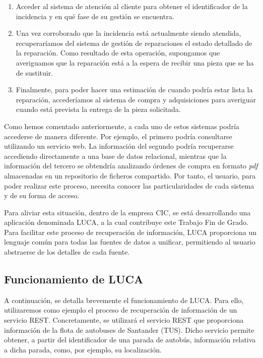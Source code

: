 \begin{enumerate}
	\item Acceder al sistema de atención al cliente para obtener el identificador de la incidencia y en qué fase de su gestión se encuentra.
	\item Una vez corroborado que la incidencia está actualmente siendo atendida, recuperaríamos del sistema de gestión de reparaciones el estado detallado de la reparación. Como resultado de esta operación, supongamos que averiguamos que la reparación está a la espera de recibir una pieza que se ha de sustituir.
	\item Finalmente, para poder hacer una estimación de cuando podría estar lista la reparación, accederíamos al sistema de compra y adquisiciones para averiguar cuando está prevista la entrega de la pieza solicitada.
\end{enumerate}

Como hemos comentado anteriormente, a cada uno de estos sistemas podría accederse de manera diferente. Por ejemplo, el primero podría consultarse utilizando un servicio web. La información del segundo podría recuperarse accediendo directamente a una base de datos relacional, mientras que la información del tercero se obtendría analizando órdenes de compra en formato \emph{pdf} almacenadas en un repositorio de ficheros compartido. Por tanto, el usuario, para poder realizar este proceso, necesita conocer las particularidades de cada sistema y de su forma de acceso.

Para aliviar esta situación, dentro de la empresa CIC, se está desarrollando una aplicación denominada LUCA, a la cual contribuye este Trabajo Fin de Grado. Para facilitar este proceso de recuperación de información, LUCA proporciona un lenguaje común para todas las fuentes de datos a unificar, permitiendo al usuario abstraerse de los detalles de cada fuente.

\subsection{Funcionamiento de LUCA}

A continuación, se detalla brevemente el funcionamiento de LUCA. Para ello, utilizaremos como ejemplo el proceso de recuperación de información de un servicio REST. Concretamente, se utilizará el servicio REST que proporciona información de la flota de autobuses de Santander (TUS). Dicho servicio permite obtener, a partir del identificador de una parada de autobús, información relativa a dicha parada, como, por ejemplo, su localización.

